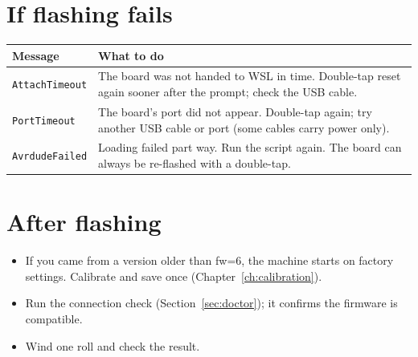 \section{If flashing fails}
\begin{center}
\renewcommand{\arraystretch}{1.4}
\begin{tabularx}{\textwidth}{@{}>{\raggedright\arraybackslash}p{}>{\raggedright\arraybackslash}X@{}}
\toprule
\textbf{Message} & \textbf{What to do} \\
\midrule
\texttt{AttachTimeout} & The board was not handed to WSL in time. Double-tap
  reset again sooner after the prompt; check the USB cable. \\
\texttt{PortTimeout} & The board's port did not appear. Double-tap again; try
  another USB cable or port (some cables carry power only). \\
\texttt{AvrdudeFailed} & Loading failed part way. Run the script again. The
  board can always be re-flashed with a double-tap. \\
\bottomrule
\end{tabularx}
\end{center}

\section{After flashing}
\begin{itemize}
  \item If you came from a version older than fw=6, the machine starts on
        factory settings. Calibrate and save once (Chapter~\ref{ch:calibration}).
  \item Run the connection check (Section~\ref{sec:doctor}); it confirms the
        firmware is compatible.
  \item Wind one roll and check the result.
\end{itemize}
